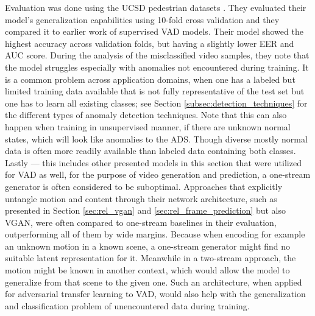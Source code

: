 Evaluation was done using the UCSD pedestrian datasets \cite{mahadevan2010anomaly}. They evaluated their model's generalization capabilities using 10-fold cross validation and they compared it to earlier work of supervised VAD models. Their model showed the highest accuracy across validation folds, but having a slightly lower EER and AUC score. During the analysis of the misclassified video samples, they note that the model struggles especially with anomalies not encountered during training. It is a common problem across application domains, when one has a labeled but limited training data available that is not fully representative of the test set but one has to learn all existing classes; see Section \ref{subsec:detection_techniques} for the different types of anomaly detection techniques. Note that this can also happen when training in unsupervised manner, if there are unknown normal states, which will look like anomalies to the ADS. Though diverse mostly normal data is often more readily available than labeled data containing both classes. Lastly --- this includes other presented models in this section that were utilized for VAD as well, for the purpose of video generation and prediction, a one-stream generator is often considered to be suboptimal. Approaches that explicitly untangle motion and content through their network architecture, such as presented in Section \ref{sec:rel_vgan} and \ref{sec:rel_frame_prediction} but also VGAN, were often compared to one-stream baselines in their evaluation, outperforming all of them by wide margins. Because when encoding for example an unknown motion in a known scene, a one-stream generator might find no suitable latent representation for it. Meanwhile in a two-stream approach, the motion might be known in another context, which would allow the model to generalize from that scene to the given one. Such an architecture, when applied for adversarial transfer learning to VAD, would also help with the generalization and classification problem of unencountered data during training.